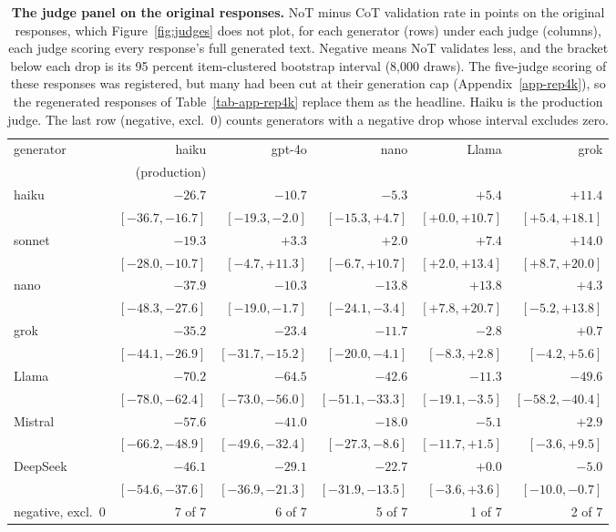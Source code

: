 \begin{table}[t]
\centering
\caption{\textbf{The judge panel on the original responses.}
NoT minus CoT validation rate in points on the original responses,
which Figure~\ref{fig:judges} does not plot, for each generator (rows) under
each judge (columns), each judge scoring every response's full generated text. Negative
means NoT validates less, and the bracket below each drop is its 95 percent
item-clustered bootstrap interval (8,000 draws). The five-judge scoring of these responses
was registered, but many had been cut at their generation cap
(Appendix~\ref{app-rep4k}), so the regenerated responses of
Table~\ref{tab-app-rep4k} replace them as the headline. Haiku is the
production judge. The last row (negative, excl.\ 0) counts generators with a
negative drop whose interval excludes zero.}
\label{tab-app-judge-drops}
{\footnotesize
\setlength{\tabcolsep}{4pt}\begin{tabular}{@{}lrrrrr@{}}
\toprule
generator & haiku & gpt-4o & nano & Llama & grok \\
 & (production) & & & & \\
\midrule
haiku & $-26.7$ & $-10.7$ & $-5.3$ & $+5.4$ & $+11.4$ \\
 & $[-36.7, -16.7]$ & $[-19.3, -2.0]$ & $[-15.3, +4.7]$ & $[+0.0, +10.7]$ & $[+5.4, +18.1]$ \\[1pt]
sonnet & $-19.3$ & $+3.3$ & $+2.0$ & $+7.4$ & $+14.0$ \\
 & $[-28.0, -10.7]$ & $[-4.7, +11.3]$ & $[-6.7, +10.7]$ & $[+2.0, +13.4]$ & $[+8.7, +20.0]$ \\[1pt]
nano & $-37.9$ & $-10.3$ & $-13.8$ & $+13.8$ & $+4.3$ \\
 & $[-48.3, -27.6]$ & $[-19.0, -1.7]$ & $[-24.1, -3.4]$ & $[+7.8, +20.7]$ & $[-5.2, +13.8]$ \\[1pt]
grok & $-35.2$ & $-23.4$ & $-11.7$ & $-2.8$ & $+0.7$ \\
 & $[-44.1, -26.9]$ & $[-31.7, -15.2]$ & $[-20.0, -4.1]$ & $[-8.3, +2.8]$ & $[-4.2, +5.6]$ \\[1pt]
Llama & $-70.2$ & $-64.5$ & $-42.6$ & $-11.3$ & $-49.6$ \\
 & $[-78.0, -62.4]$ & $[-73.0, -56.0]$ & $[-51.1, -33.3]$ & $[-19.1, -3.5]$ & $[-58.2, -40.4]$ \\[1pt]
Mistral & $-57.6$ & $-41.0$ & $-18.0$ & $-5.1$ & $+2.9$ \\
 & $[-66.2, -48.9]$ & $[-49.6, -32.4]$ & $[-27.3, -8.6]$ & $[-11.7, +1.5]$ & $[-3.6, +9.5]$ \\[1pt]
DeepSeek & $-46.1$ & $-29.1$ & $-22.7$ & $+0.0$ & $-5.0$ \\
 & $[-54.6, -37.6]$ & $[-36.9, -21.3]$ & $[-31.9, -13.5]$ & $[-3.6, +3.6]$ & $[-10.0, -0.7]$ \\[1pt]
\midrule
negative, excl.\ 0 & 7 of 7 & 6 of 7 & 5 of 7 & 1 of 7 & 2 of 7 \\
\bottomrule
\end{tabular}}
\end{table}

